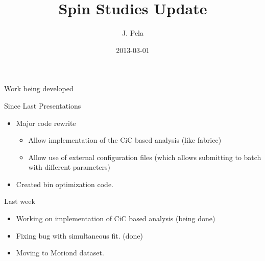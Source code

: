 \documentclass[8pt]{beamer}
\author[João Pela]{J. Pela}
\title[Spin Studies Update]{Spin Studies Update}
\institute{Imperial College London}
\date{2013-03-01}
\begin{document}
\setlength{\unitlength}{1mm}

\begin{frame}
  \titlepage
\end{frame}

\begin{frame}{Work being developed}

  \begin{block}{Since Last Presentations}
    
    \begin{itemize}
      \item Major code rewrite
      \begin{itemize}
        \item Allow implementation of the CiC based analysis (like fabrice)
        \item Allow use of external configuration files (which allows submitting to batch with different parameters)
      \end{itemize}
      \item Created bin optimization code.
    \end{itemize}

  \end{block}

  \begin{block}{Last week}
 
    \begin{itemize}
      \item Working on implementation of CiC based analysis (being done)
      \item Fixing bug with simultaneous fit. (done)
      \item Moving to Moriond dataset.
    \end{itemize}
 
  \end{block}

\end{frame}
\end{document}
